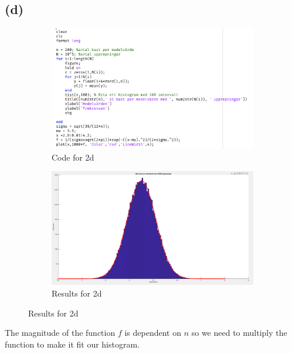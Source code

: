 \documentclass{article}
\begin{document}
\subsection{(d)}
\begin{figure}[H]
    \begin{subfigure}[h]{0.45\linewidth}
        \includegraphics[width=\linewidth]{imgs/q2d_code.png}
        \caption{Code for 2d}
    \end{subfigure}
    \hfill
    \begin{subfigure}[h]{0.45\linewidth}
        \includegraphics[width=\linewidth]{imgs/q2d_graph.png}
        \caption{Results for 2d}
    \end{subfigure}
\end{figure}
The magnitude of the function \( f \) is dependent on \( n \) so we need to multiply the function 
to make it fit our histogram.
\end{document}

